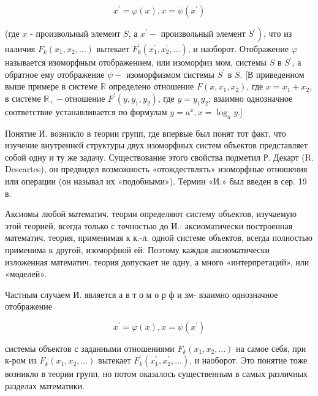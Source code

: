 \documentclass[10pt]{article}
\begin{document}
\[

x^{\prime}=\varphi(x), x=\psi\left(x^{\prime}\right)

\]



(где $x$ - произвольный элемент $S$, а $x^{\prime}-$ произвольный элемент $\left.S^{\prime}\right)$, что из наличия $F_{k}\left(x_{1}, x_{2}, \ldots\right)$ вытекает $F_{k}^{\prime}\left(x_{1}^{\prime}, x_{2}^{\prime}, \ldots\right)$, и наоборот. Отображение $\varphi$ называется изоморфным отображением, или изоморфиз мом, системы $S$ в $S^{\prime}$, а обратное ему отображение $\psi-$ изоморфизмом системы $S^{\prime}$ в $S$. [В приведенном выше примере в системе $\mathbb{R}$ определено отношение $F\left(x, x_{1}, x_{2}\right)$, где $x=x_{1}+x_{2}$, в системе $\mathbb{R}_{+}-$отношение $F^{\prime}\left(y, y_{1}, y_{2}\right)$, где $y=y_{1} y_{2}$; взаимно однозначное соответствие устанавливается по формулам $y=a^{x}, x=\log _{a} y$.]



Понятие И. возникло в теории групп, где впервые был понят тот факт, что изучение внутренней структуры двух изоморфных систем объектов представляет собой одну и ту же задачу. Существование этого свойства подметил Р. Декарт (R. Descartes), он предвидел возможность «отождествлять» изоморфные отношения или операции (он называл их «подобными»). Термин «И.» был введен в сер. 19 в.



Аксиомы любой математич. теории определяют систему объектов, изучаемую этой теорией, всегда только с точностью до И.: аксиоматически построенная математич. теория, применимая к к.-л. одной системе объектов, всегда полностью применима к другой, изоморфной ей. Поэтому каждая аксиоматически изложенная математич. теория допускает не одну, а много «интерпретаций», или «моделей».



Частным случаем И. является а в т о м о р ф и зм- взаимно однозначное отображение



\[

x^{\prime}=\varphi(x), x=\psi\left(x^{\prime}\right)

\]



системы объектов с заданными отношениями $F_{k}\left(x_{1}, x_{2}, \ldots\right)$ на самое себя, при к-ром из $F_{k}\left(x_{1}, x_{2}, \ldots\right)$ вытекает $F_{k}^{\prime}\left(x_{1}^{\prime}, x_{2}^{\prime}, \ldots\right)$, и наоборот. Это понятие тоже возникло в теории групп, но потом оказалось существенным в самых различных разделах математики.
\end{document}
